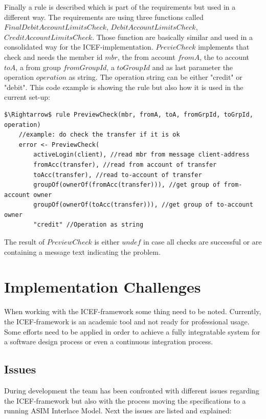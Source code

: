 Finally a rule is described which is part of the requirements but used in a different way. The requirements are using three functions called $FinalDebitAccountLimitsCheck$, $DebitAccountLimitsCheck$, $CreditAccountLimitsCheck$. Those function are basically similar and used in a consolidated way for the ICEF-implementation. $PrevieCheck$ implements that check and needs the member id $mbr$, the from account $fromA$, the to account $toA$, a from group $fromGroupId$, a $toGroupId$ and as last parameter the operation $operation$ as string. The operation string can be either "credit" or "debit". This code example is showing the rule but also how it is used in the current set-up:

\begin{lstlisting}[language=bsl,mathescape=true]
	$\Rightarrow$ rule PreviewCheck(mbr, fromA, toA, fromGrpId, toGrpId, operation)
	//example: do check the transfer if it is ok
	error <- PreviewCheck(
		activeLogin(client), //read mbr from message client-address
		fromAcc(transfer), //read from account of transfer
		toAcc(transfer), //read to-account of transfer
		groupOf(ownerOf(fromAcc(transfer))), //get group of from-account owner
		groupOf(ownerOf(toAcc(transfer))), //get group of to-account owner
		"credit" //Operation as string
\end{lstlisting}

The result of $PreviewCheck$ is either $undef$ in case all checks are successful or are containing a message text indicating the problem.

\section{Implementation Challenges}
\label{sec:impl-challenges}

When working with the ICEF-framework some thing need to be noted. Currently, the ICEF-framework is an academic tool and not ready for professional usage. Some efforts need to be applied in order to achieve a fully integratable system for a software design process or even a continuous integration process.

\subsection{Issues}

During development the team has been confronted with different issues regarding the ICEF-framework but also with the process moving the specifications to a running ASIM Interlace Model. Next the issues are listed and explained:

